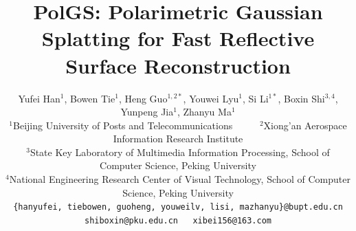 \documentclass[10pt,twocolumn,letterpaper]{article}
\author{Yufei Han$^1$, Bowen Tie$^1$, Heng Guo$^{1,2*}$, Youwei Lyu$^1$, Si Li$^{1*}$, Boxin Shi$^{3,4}$, Yunpeng Jia$^1$, Zhanyu Ma$^1$\\
\small{$^1$Beijing University of Posts and Telecommunications}~~~~~
\small{$^2$Xiong'an Aerospace Information Research Institute}\\
\small{$^3$State Key Laboratory of Multimedia Information Processing, School of Computer Science, Peking University}\\
\small{$^4$National Engineering Research Center of Visual Technology, School of Computer Science, Peking University}\\
{\tt\small \{hanyufei, tiebowen, guoheng, youweilv, lisi, mazhanyu\}@bupt.edu.cn}\\
{\tt\small shiboxin@pku.edu.cn~~~xibei156@163.com}
}
\begin{document}
\title{PolGS: Polarimetric Gaussian Splatting for Fast Reflective \\Surface Reconstruction}

    






{
    \small
    
    
}
\end{document}
